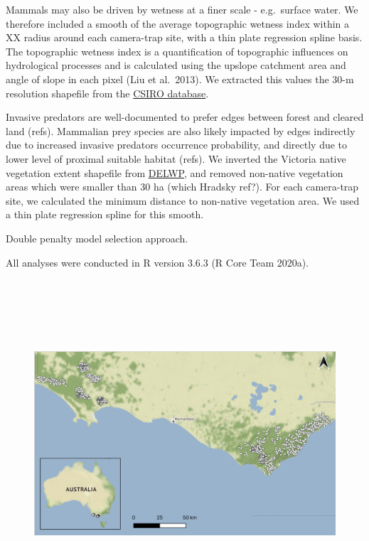 \documentclass[11pt,a4paper,titlepage,twoside,openright]{style/unimelbthesis}
\begin{document}
\begin{mainmatter}
Mammals may also be driven by wetness at a finer scale - e.g.~surface water. We therefore included a smooth of the average topographic wetness index within a XX radius around each camera-trap site, with a thin plate regression spline basis. The topographic wetness index is a quantification of topographic influences on hydrological processes and is calculated using the upslope catchment area and angle of slope in each pixel (Liu et al.~2013). We extracted this values the 30-m resolution shapefile from the \href{\%22https://data.csiro.au/dap/landingpage?pid=csiro\%3A5588\%22}{CSIRO database}.

Invasive predators are well-documented to prefer edges between forest and cleared land (refs). Mammalian prey species are also likely impacted by edges indirectly due to increased invasive predators occurrence probability, and directly due to lower level of proximal suitable habitat (refs). We inverted the Victoria native vegetation extent shapefile from \href{\%22https://discover.data.vic.gov.au/dataset/native-vegetation-modelled-2005-ecological-vegetation-classes-with-bioregional-conservation-sta\%22}{DELWP}, and removed non-native vegetation areas which were smaller than 30 ha (which Hradsky ref?). For each camera-trap site, we calculated the minimum distance to non-native vegetation area. We used a thin plate regression spline for this smooth.

Double penalty model selection approach.

All analyses were conducted in R version 3.6.3 (R Core Team 2020a).

\newpage

\(~\)

\(~\)

\(~\)
\begin{figure}

{\centering \includegraphics[width=1\linewidth]{figure/c1/fig1_map} 

}
\end{figure}
\end{mainmatter}
\end{document}
